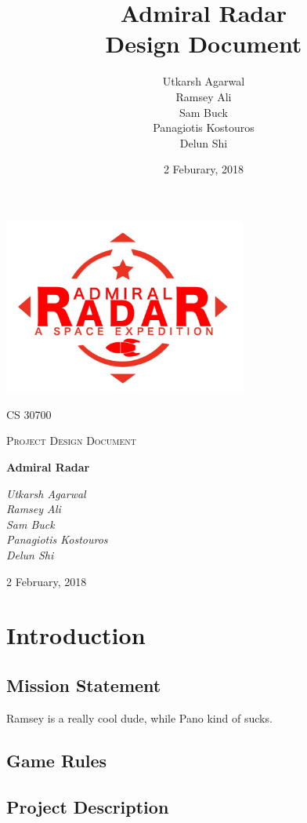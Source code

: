 \documentclass[12pt]{article}
\title{ Admiral Radar \\ \large Design Document}
\author{Utkarsh Agarwal\\ Ramsey Ali \\ Sam Buck \\ Panagiotis Kostouros \\ Delun Shi }
\date{2 Feburary, 2018}
\begin{document}
\begin{titlepage}
	\centering
	\includegraphics[width=0.6\textwidth]{logo}\par\vspace{1cm}
	{\scshape\LARGE CS 30700 \par}
	{\scshape\Large Project Design Document\par}
	\vspace{1.5cm}
	{\Huge\bfseries Admiral Radar\par}
	\vspace{2cm}
	{\Large\itshape Utkarsh Agarwal\\ Ramsey Ali \\ Sam Buck \\ Panagiotis Kostouros \\ Delun Shi \par}

	\vfill
	{\large 2 February, 2018 \par}
\end{titlepage}

\tableofcontents

\section{Introduction}

\subsection{Mission Statement}

Ramsey is a really cool dude, while Pano kind of sucks.
\subsection{Game Rules}

\subsection{Project Description}
\end{document}
